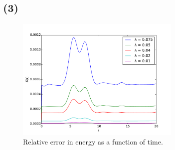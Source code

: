 \documentclass[10pt]{article}
\begin{document}
\clearpage
\subsection*{(3)}

\begin{figure}
  \centering
  \includegraphics[width=0.7\textwidth]{2/En.pdf}
  \caption{Relative error in energy as a function of time.}
  \label{f:eerr}
\end{figure}
\end{document}
